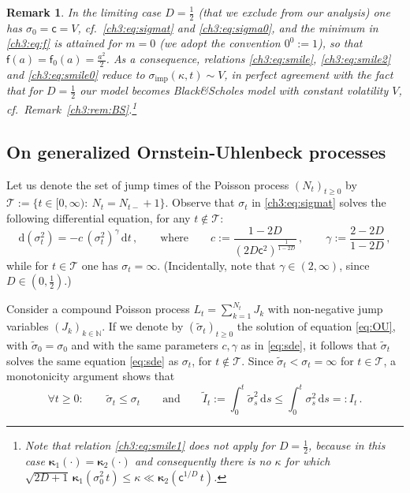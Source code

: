 \documentclass[a4paper,reqno,11pt]{amsart}
\numberwithin{equation}{section}
\newtheorem{remark}[theorem]{Remark}
\newcommand{\cT}{{\ensuremath{\mathcal T}} }
\renewcommand{\tilde}{\widetilde}          %
\newcommand{\dd}{\text{\rm d}}             %
\newcommand{\N}{\mathbb{N}}
\newcommand\sfc{\mathsf{c}}
\newcommand\sff{\mathsf{f}}
\def\dd{\mathrm{d}}
\newcommand\imp{\mathrm{imp}}
\newcommand\bkappa{\boldsymbol{\kappa}}
\begin{document}
\begin{remark}\rm
In the limiting case $D = \frac{1}{2}$ (that we exclude from our analysis)
one has $\sigma_0 = \sfc = V$, 
cf.\ \eqref{ch3:eq:sigmat} and \eqref{ch3:eq:sigma0},
and the minimum in \eqref{ch3:eq:f}
is attained for $m=0$  (we adopt the convention $0^0 := 1$), so that $\sff(a) = \sff_0(a) = \frac{a^2}{2}$.
As a consequence, relations \eqref{ch3:eq:smile}, \eqref{ch3:eq:smile2} and \eqref{ch3:eq:smile0}
reduce to $\sigma_\imp(\kappa,t) \sim V$,
in perfect agreement with the fact that for $D = \frac{1}{2}$ 
our model becomes Black\&Scholes model with
constant volatility $V$, cf.\ Remark~\ref{ch3:rem:BS}.\footnote{Note 
that relation \eqref{ch3:eq:smile1} 
does not apply for $D=\frac{1}{2}$, because 
in this case $\bkappa_1(\cdot) = \bkappa_2(\cdot)$ and consequently 
there is no $\kappa$ for which 
$\sqrt{2D+1} \,
\bkappa_1(\sigma_0^2 \, t) \leq \kappa \ll \bkappa_2(\sfc^{1/D}\, t)$.}
\end{remark}

\subsection{On generalized Ornstein-Uhlenbeck processes}
\label{sec:OU}

Let us denote the
set of jump times of the Poisson process $(N_t)_{t\ge 0}$
by $\cT := \{t \in [0,\infty): \ N_t = N_{t-}+1\}$.
Observe that $\sigma_t$ in \eqref{ch3:eq:sigmat} solves the
following differential equation, for any $t \not\in \cT$:
\begin{equation} \label{eq:sde}
	\dd (\sigma_t^2) 
	= - c \, (\sigma_t^2)^\gamma \, \dd t \,, \qquad \text{where} \qquad
	c := \frac{1-2D}{(2D \sfc^2)^{\frac{1}{1-2D}}} \,, \qquad
	\gamma := \frac{2-2D}{1-2D} \,, 
\end{equation}
while for $t\in\cT$ one has $\sigma_t = \infty$.
(Incidentally, note that $\gamma \in (2,\infty)$, since $D \in (0,\frac{1}{2})$.)

Consider a compound Poisson process $L_t = \sum_{k=1}^{N_t} J_k$
with non-negative jump variables $(J_k)_{k\in\N}$.
If we denote by $(\tilde \sigma_t)_{t\ge 0}$ the solution
of equation \eqref{eq:OU}, with $\tilde \sigma_0 = \sigma_0$ and
with the same parameters $c, \gamma$ as in \eqref{eq:sde},
it follows that $\tilde \sigma_t$ solves the same equation
\eqref{eq:sde} as $\sigma_t$, for $t\not\in \cT$. Since $\tilde \sigma_t < \sigma_t = \infty$
for $t \in \cT$, a monotonicity argument shows that 
\begin{equation} \label{eq:IItilde}
	\forall t\ge 0: \qquad
	\tilde\sigma_t \le \sigma_t \qquad \text{and} \qquad
	\tilde I_t := \int_0^t \tilde\sigma_s^2 \, \dd s
	\le \int_0^t \sigma_s^2 \, \dd s =: I_t \,.
\end{equation}
\end{document}
